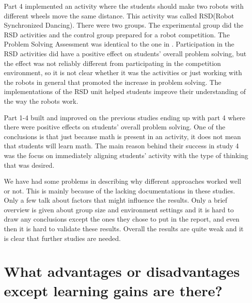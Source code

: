 \bigskip\noindent
Part 4 implemented an activity where the students should make two robots with different wheels move the same distance. This activity was called RSD(Robot Synchronized Dancing). There were two groups. The experimental group did the RSD activities and the control group prepared for a robot competition. The Problem Solving Assessment was identical to the one in . Participation in the RSD activities did have a positive effect on students' overall problem solving, but the effect was not reliably different from participating in the competition environment, so it is not clear whether it was the activities or just working with the robots in general that promoted the increase in problem solving. The implementations of the RSD unit helped students improve their understanding of the way the robots work. 

\bigskip\noindent
Part 1-4 built and improved on the previous studies ending up with part 4 where there were positive effects on students' overall problem solving. One of the conclusions is that just because math is present in an activity, it does not mean that students will learn math. The main reason behind their success in study 4 was the focus on immediately aligning students' activity with the type of thinking that was desired.

\bigskip\noindent
We have had some problems in describing why different approaches worked well or not. This is mainly because of the lacking documentations in these studies. Only a few talk about factors that might influence the results. Only a brief overview is given about group size and environment settings and it is hard to draw any conclusions except the ones they chose to put in the report, and even then it is hard to validate these results. Overall the results are quite weak and it is clear that further studies are needed.

\section{What advantages or disadvantages except learning gains are there?}

